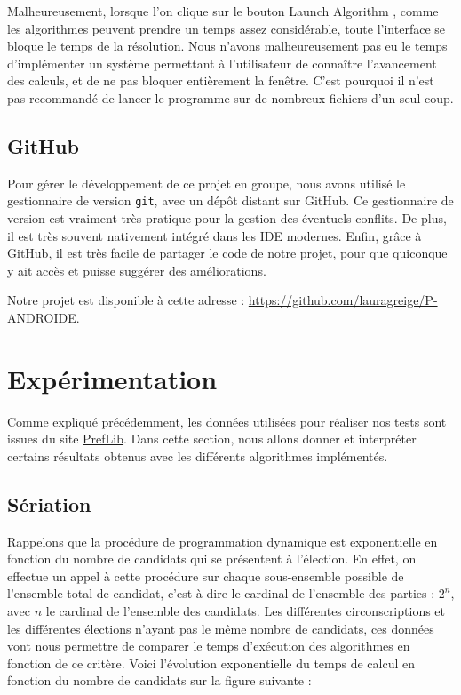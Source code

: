 \documentclass[11pt, a4paper]{article}
\begin{document}
Malheureusement, lorsque l'on clique sur le bouton \og Launch Algorithm \fg{}, comme les algorithmes peuvent prendre un temps assez considérable, toute l'interface se bloque le temps de la résolution. Nous n'avons malheureusement pas eu le temps d'implémenter un système permettant à l'utilisateur de connaître l'avancement des calculs, et de ne pas bloquer entièrement la fenêtre. C'est pourquoi il n'est pas recommandé de lancer le programme sur de nombreux fichiers d'un seul coup.

\subsection{GitHub}
Pour gérer le développement de ce projet en groupe, nous avons utilisé le gestionnaire de version \texttt{git}, avec un dépôt distant sur GitHub. Ce gestionnaire de version est vraiment très pratique pour la gestion des éventuels conflits. De plus, il est très souvent nativement intégré dans les IDE modernes. Enfin, grâce à GitHub, il est très facile de partager le code de notre projet, pour que quiconque y ait accès et puisse suggérer des améliorations.

Notre projet est disponible à cette adresse : \href{https://github.com/lauragreige/P-ANDROIDE}{https://github.com/lauragreige/P-ANDROIDE}.

\section{Exp\'{e}rimentation}

Comme expliqué précédemment, les données utilisées pour réaliser nos tests sont issues du site \href{http://www.preflib.org/}{PrefLib}. Dans cette section, nous allons donner et interpréter certains résultats obtenus avec les différents algorithmes implémentés.

\subsection{Sériation}
Rappelons que la procédure de programmation dynamique est exponentielle en fonction du nombre de candidats qui se présentent à l'élection. En effet, on effectue un appel à cette procédure sur chaque sous-ensemble possible de l'ensemble total de candidat, c'est-à-dire le cardinal de l'ensemble des parties : $2^n$, avec $n$ le cardinal de l'ensemble des candidats. Les différentes circonscriptions et les différentes élections n'ayant pas le même nombre de candidats, ces données vont nous permettre de comparer le temps d'exécution des algorithmes en fonction de ce critère. Voici l'évolution exponentielle du temps de calcul en fonction du nombre de candidats sur la figure suivante :
\end{document}
